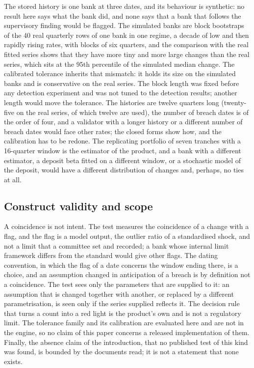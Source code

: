 The stored history is one bank at three dates, and its behaviour is synthetic: no result here says what the bank did, and none says that a bank that follows the supervisory finding would be flagged. The simulated banks are block bootstraps of the 40 real quarterly rows of one bank in one regime, a decade of low and then rapidly rising rates, with blocks of six quarters, and the comparison with the real fitted series shows that they have more tiny and more large changes than the real series, which sits at the 95th percentile of the simulated median change. The calibrated tolerance inherits that mismatch: it holds its size on the simulated banks and is conservative on the real series. The block length was fixed before any detection experiment and was not tuned to the detection results; another length would move the tolerance. The histories are twelve quarters long (twenty-five on the real series, of which twelve are used), the number of breach dates is of the order of four, and a validator with a longer history or a different number of breach dates would face other rates; the closed forms show how, and the calibration has to be redone. The replicating portfolio of seven tranches with a 16-quarter window is the estimator of the product, and a bank with a different estimator, a deposit beta fitted on a different window, or a stochastic model of the deposit, would have a different distribution of changes and, perhaps, no ties at all.

\subsection{Construct validity and scope}
\label{sec:lim-construct}

A coincidence is not intent. The test measures the coincidence of a change with a flag, and the flag is a model output, the outlier ratio of a standardised shock, and not a limit that a committee set and recorded; a bank whose internal limit framework differs from the standard would give other flags. The dating convention, in which the flag of a date concerns the window ending there, is a choice, and an assumption changed in anticipation of a breach is by definition not a coincidence. The test sees only the parameters that are supplied to it: an assumption that is changed together with another, or replaced by a different parametrisation, is seen only if the series supplied reflects it. The decision rule that turns a count into a red light is the product's own and is not a regulatory limit. The tolerance family and its calibration are evaluated here and are not in the engine, so no claim of this paper concerns a released implementation of them. Finally, the absence claim of the introduction, that no published test of this kind was found, is bounded by the documents read; it is not a statement that none exists.
